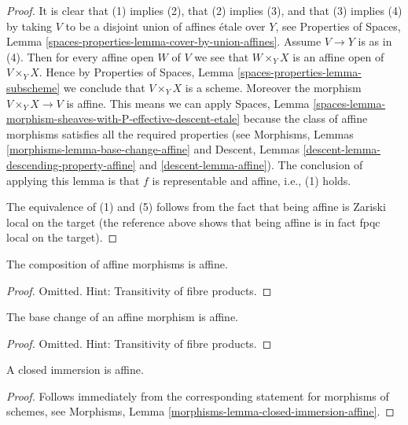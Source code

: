 \begin{proof}
It is clear that (1) implies (2), that (2) implies (3), and that
(3) implies (4) by taking $V$ to be a disjoint union of affines
\'etale over $Y$, see Properties of Spaces,
Lemma \ref{spaces-properties-lemma-cover-by-union-affines}.
Assume $V \to Y$ is as in (4). Then for every affine open $W$ of $V$ we see
that $W \times_Y X$ is an affine open of $V \times_Y X$. Hence by
Properties of Spaces, Lemma \ref{spaces-properties-lemma-subscheme}
we conclude that $V \times_Y X$ is a scheme. Moreover the morphism
$V \times_Y X \to V$ is affine. This means we can apply
Spaces,
Lemma \ref{spaces-lemma-morphism-sheaves-with-P-effective-descent-etale}
because the class of affine morphisms satisfies all the required
properties (see
Morphisms, Lemmas \ref{morphisms-lemma-base-change-affine} and
Descent, Lemmas \ref{descent-lemma-descending-property-affine}
and \ref{descent-lemma-affine}). The conclusion of applying this lemma
is that $f$ is representable and affine, i.e., (1) holds.

\medskip\noindent
The equivalence of (1) and (5) follows from the fact that being
affine is Zariski local on the target (the reference above shows
that being affine is in fact fpqc local on the target).
\end{proof}

\begin{lemma}
\label{lemma-composition-affine}
The composition of affine morphisms is affine.
\end{lemma}

\begin{proof}
Omitted. Hint: Transitivity of fibre products.
\end{proof}

\begin{lemma}
\label{lemma-base-change-affine}
The base change of an affine morphism is affine.
\end{lemma}

\begin{proof}
Omitted. Hint: Transitivity of fibre products.
\end{proof}

\begin{lemma}
\label{lemma-closed-immersion-affine}
A closed immersion is affine.
\end{lemma}

\begin{proof}
Follows immediately from the corresponding statement for morphisms of
schemes, see Morphisms, Lemma \ref{morphisms-lemma-closed-immersion-affine}.
\end{proof}

